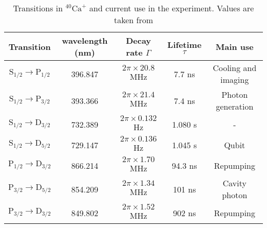 \begin{table}[H]
\centering
\begin{tabular}{c c c c c}
 \toprule
    {Transition} & {wavelength (nm)} & {Decay rate $\Gamma$} & Lifetime $\tau$ & {Main use} \\ \midrule
   $\text{S}_{1/2} \to \text{P}_{1/2}$ & 396.847 & $2\pi \times 20.8$ MHz & 7.7 ns &  Cooling and imaging \\
    $\text{S}_{1/2} \to \text{P}_{3/2}$  & 393.366 & $2\pi \times 21.4$ MHz & 7.4 ns & Photon generation\\ \midrule
   $\text{S}_{1/2} \to \text{D}_{3/2}$ & 732.389 & $2\pi \times 0.132$ Hz & 1.080 s & - \\
    $\text{S}_{1/2} \to \text{D}_{5/2}$  & 729.147 & $2\pi \times 0.136$ Hz & 1.045 s   & Qubit  \\\midrule
    $\text{P}_{1/2} \to \text{D}_{3/2}$  & 866.214 &  $2\pi \times 1.70$ MHz  &  94.3 ns  & Repumping \\
    $\text{P}_{3/2} \to \text{D}_{5/2}$  & 854.209 & $2\pi \times 1.34$ MHz & 101 ns  & Cavity photon  \\
    $\text{P}_{3/2} \to \text{D}_{3/2}$  & 849.802 & $2\pi \times 1.52$ MHz  & 902 ns   & Repumping \\ \bottomrule
\end{tabular}
\caption{Transitions in $^{40}\text{Ca}^+$ and current use in the experiment. Values are taken from \cite{ion_spacing,stute}}
\label{transitiontable}
\end{table}

